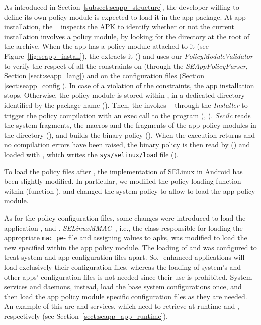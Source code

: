 As introduced in Section~\ref{subsect:seapp_structure}, the developer
willing to define its own policy module is expected to load it in the
app package.  At app installation, the \pms~\cite{seapp_pmsserva}
inspects the APK to identify whether or not the current installation
involves a policy module, by looking for the \apkpolicydir directory
at the root of the archive.  When the app has a policy module attached
to it (see Figure~\ref{fig:seapp_install}), the \pms extracts it
() and uses our \textit{PolicyModuleValidator} to
verify the respect of all the constraints on \sepolicy (through the
{\em SEAppPolicyParser}, Section \ref{sect:seapp_lang}) and on the
configuration files (Section \ref{sect:seapp_config}).  In case of a
violation of the constraints, the app installation stops.  Otherwise,
the policy module is stored within \dataselinux, in a dedicated
directory identified by the package name ().  Then, the
\pms invokes \installd~\cite{seapp_installdid} through the {\em
  Installer} to trigger the policy compilation with an exec call to
the \secilc program (, ).  {\em Secilc}
reads the system \sepolicy fragments, the \seapp macros and the
\sepolicy fragments of the app policy modules in the \dataselinux
directory (), and builds the binary policy
().  When the \secilc execution returns and no
compilation errors have been raised, the binary policy is then read by
\installd () and loaded with \loadpolicy, which writes
the \texttt{sys/selinux/load} file ().

To load the policy files after \init, the implementation of SELinux in
Android has been slightly modified.  In particular, we modified the
policy loading function within \libselinux (function \loadpolicy), and
changed the system policy to allow \installd to load the app policy
module.

As for the policy configuration files, some changes were introduced to
load the application \filecontexts, \seappcontexts and
\macpermissions.  {\em SELinuxMMAC}~\cite{seapp_mmacsel}, i.e., the
class responsible for loading the appropriate {\tt mac\textunderscore
  pe}-  file and assigning \seinfo values
to apks, was modified to load the new \macpermissions specified within
the app policy module.  The loading of \filecontexts and
\seappcontexts was configured to treat system and app configuration
files apart.  So, \seapp-enhanced applications will load exclusively
their configuration files, whereas the loading of system's and other
apps' configuration files is not needed since their use is prohibited.
System services and daemons, instead, load the base system
configurations once, and then load the app policy module specific
configuration files as they are needed.  An example of this are
\zygote and \restorecon services, which need to retrieve at runtime
\seappcontexts and \filecontexts, respectively (see
Section~\ref{sect:seapp_app_runtime}).

